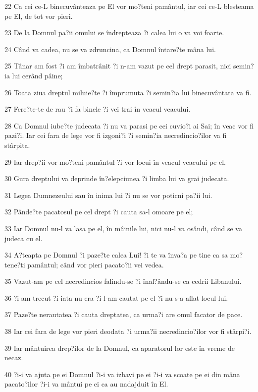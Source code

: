 \par 22 Ca cei ce-L binecuvânteaza pe El vor mo?teni pamântul, iar cei ce-L blesteama pe El, de tot vor pieri.
\par 23 De la Domnul pa?ii omului se îndrepteaza ?i calea lui o va voi foarte.
\par 24 Când va cadea, nu se va zdruncina, ca Domnul întare?te mâna lui.
\par 25 Tânar am fost ?i am îmbatrânit ?i n-am vazut pe cel drept parasit, nici semin?ia lui cerând pâine;
\par 26 Toata ziua dreptul miluie?te ?i împrumuta ?i semin?ia lui binecuvântata va fi.
\par 27 Fere?te-te de rau ?i fa binele ?i vei trai în veacul veacului.
\par 28 Ca Domnul iube?te judecata ?i nu va parasi pe cei cuvio?i ai Sai; în veac vor fi pazi?i. Iar cei fara de lege vor fi izgoni?i ?i semin?ia necredincio?ilor va fi stârpita.
\par 29 Iar drep?ii vor mo?teni pamântul ?i vor locui în veacul veacului pe el.
\par 30 Gura dreptului va deprinde în?elepciunea ?i limba lui va grai judecata.
\par 31 Legea Dumnezeului sau în inima lui ?i nu se vor poticni pa?ii lui.
\par 32 Pânde?te pacatosul pe cel drept ?i cauta sa-l omoare pe el;
\par 33 Iar Domnul nu-l va lasa pe el, în mâinile lui, nici nu-l va osândi, când se va judeca cu el.
\par 34 A?teapta pe Domnul ?i paze?te calea Lui! ?i te va înva?a pe tine ca sa mo?tene?ti pamântul; când vor pieri pacato?ii vei vedea.
\par 35 Vazut-am pe cel necredincios falindu-se ?i înal?ându-se ca cedrii Libanului.
\par 36 ?i am trecut ?i iata nu era ?i l-am cautat pe el ?i nu s-a aflat locul lui.
\par 37 Paze?te nerautatea ?i cauta dreptatea, ca urma?i are omul facator de pace.
\par 38 Iar cei fara de lege vor pieri deodata ?i urma?ii necredincio?ilor vor fi stârpi?i.
\par 39 Iar mântuirea drep?ilor de la Domnul, ca aparatorul lor este în vreme de necaz.
\par 40 ?i-i va ajuta pe ei Domnul ?i-i va izbavi pe ei ?i-i va scoate pe ei din mâna pacato?ilor ?i-i va mântui pe ei ca au nadajduit în El.


